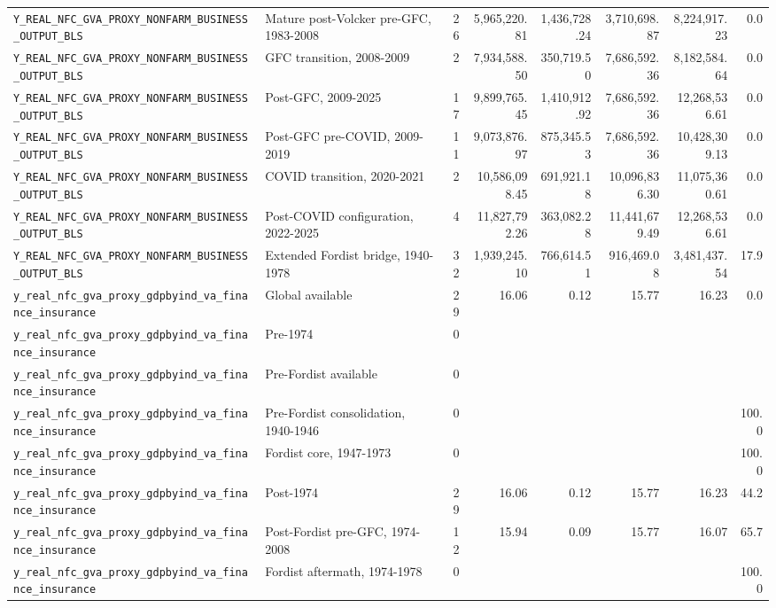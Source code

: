 \begin{landscape}
\begin{longtable}{p{4.4cm}p{3.8cm}rrrrrr}
\nolinkurl{Y_REAL_NFC_GVA_PROXY_NONFARM_BUSINESS_OUTPUT_BLS} & Mature post-Volcker pre-GFC, 1983-2008 & 26 & 5,965,220.81 & 1,436,728.24 & 3,710,698.87 & 8,224,917.23 & 0.0
\\
\nolinkurl{Y_REAL_NFC_GVA_PROXY_NONFARM_BUSINESS_OUTPUT_BLS} & GFC transition, 2008-2009 & 2 & 7,934,588.50 & 350,719.50 & 7,686,592.36 & 8,182,584.64 & 0.0
\\
\nolinkurl{Y_REAL_NFC_GVA_PROXY_NONFARM_BUSINESS_OUTPUT_BLS} & Post-GFC, 2009-2025 & 17 & 9,899,765.45 & 1,410,912.92 & 7,686,592.36 & 12,268,536.61 & 0.0
\\
\nolinkurl{Y_REAL_NFC_GVA_PROXY_NONFARM_BUSINESS_OUTPUT_BLS} & Post-GFC pre-COVID, 2009-2019 & 11 & 9,073,876.97 & 875,345.53 & 7,686,592.36 & 10,428,309.13 & 0.0
\\
\nolinkurl{Y_REAL_NFC_GVA_PROXY_NONFARM_BUSINESS_OUTPUT_BLS} & COVID transition, 2020-2021 & 2 & 10,586,098.45 & 691,921.18 & 10,096,836.30 & 11,075,360.61 & 0.0
\\
\nolinkurl{Y_REAL_NFC_GVA_PROXY_NONFARM_BUSINESS_OUTPUT_BLS} & Post-COVID configuration, 2022-2025 & 4 & 11,827,792.26 & 363,082.28 & 11,441,679.49 & 12,268,536.61 & 0.0
\\
\nolinkurl{Y_REAL_NFC_GVA_PROXY_NONFARM_BUSINESS_OUTPUT_BLS} & Extended Fordist bridge, 1940-1978 & 32 & 1,939,245.10 & 766,614.51 & 916,469.08 & 3,481,437.54 & 17.9
\\
\nolinkurl{y_real_nfc_gva_proxy_gdpbyind_va_finance_insurance} & Global available & 29 & 16.06 & 0.12 & 15.77 & 16.23 & 0.0
\\
\nolinkurl{y_real_nfc_gva_proxy_gdpbyind_va_finance_insurance} & Pre-1974 & 0 &  &  &  &  &
\\
\nolinkurl{y_real_nfc_gva_proxy_gdpbyind_va_finance_insurance} & Pre-Fordist available & 0 &  &  &  &  &
\\
\nolinkurl{y_real_nfc_gva_proxy_gdpbyind_va_finance_insurance} & Pre-Fordist consolidation, 1940-1946 & 0 &  &  &  &  & 100.0
\\
\nolinkurl{y_real_nfc_gva_proxy_gdpbyind_va_finance_insurance} & Fordist core, 1947-1973 & 0 &  &  &  &  & 100.0
\\
\nolinkurl{y_real_nfc_gva_proxy_gdpbyind_va_finance_insurance} & Post-1974 & 29 & 16.06 & 0.12 & 15.77 & 16.23 & 44.2
\\
\nolinkurl{y_real_nfc_gva_proxy_gdpbyind_va_finance_insurance} & Post-Fordist pre-GFC, 1974-2008 & 12 & 15.94 & 0.09 & 15.77 & 16.07 & 65.7
\\
\nolinkurl{y_real_nfc_gva_proxy_gdpbyind_va_finance_insurance} & Fordist aftermath, 1974-1978 & 0 &  &  &  &  & 100.0

\end{longtable}
\end{landscape}
